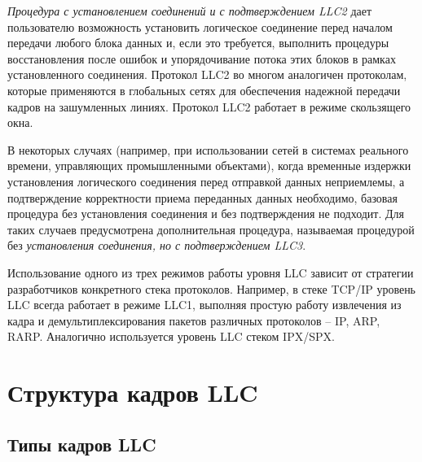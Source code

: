 \emph{Процедура с установлением соединений и с подтверждением LLC2} дает пользователю возможность установить логическое соединение перед началом передачи любого блока данных и, если это требуется, выполнить процедуры восстановления после ошибок и упорядочивание потока этих блоков в рамках установленного соединения.
Протокол LLC2 во многом аналогичен протоколам, которые применяются в глобальных сетях для обеспечения надежной передачи кадров на зашумленных линиях.
Протокол LLC2 работает в режиме скользящего окна.

В некоторых случаях (например, при использовании сетей в системах реального времени, управляющих промышленными объектами), когда временные издержки установления логического соединения перед отправкой данных неприемлемы, а подтверждение корректности приема переданных данных необходимо, базовая процедура без установления соединения и без подтверждения не подходит.
Для таких случаев предусмотрена дополнительная процедура, называемая процедурой без \emph{установления соединения, но с подтверждением LLC3}.

Использование одного из трех режимов работы уровня LLC зависит от стратегии разработчиков конкретного стека протоколов.
Например, в стеке TCP/IP уровень LLC всегда работает в режиме LLC1, выполняя простую работу извлечения из кадра и демультиплексирования пакетов различных протоколов – IP, ARP, RARP.
Аналогично используется уровень LLC стеком IPX/SPX.

\section{Структура кадров LLC}

\subsection{Типы кадров LLC}

